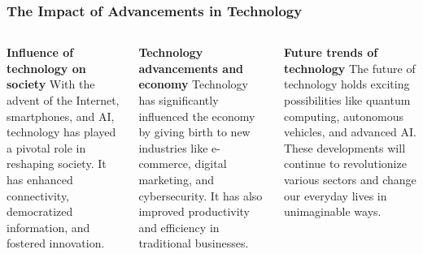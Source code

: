 \documentclass[5pt]{beamer}
\begin{document}
\begin{frame}
\frametitle{The Impact of Advancements in Technology}
\begin{columns}
\begin{column}{0.3\textwidth}
\begin{block}{\textbf{Influence of technology on society}}
With the advent of the Internet, smartphones, and AI, technology has played a pivotal role in reshaping society. It has enhanced connectivity, democratized information, and fostered innovation.
\end{block}
\end{column}
\begin{column}{0.3\textwidth}
\begin{block}{\textbf{Technology advancements and economy}}
Technology has significantly influenced the economy by giving birth to new industries like e-commerce, digital marketing, and cybersecurity. It has also improved productivity and efficiency in traditional businesses.
\end{block}
\end{column}
\begin{column}{0.3\textwidth}
\begin{block}{\textbf{Future trends of technology}}
The future of technology holds exciting possibilities like quantum computing, autonomous vehicles, and advanced AI. These developments will continue to revolutionize various sectors and change our everyday lives in unimaginable ways.
\end{block}
\end{column}
\end{columns}
\end{frame}
\end{document}
